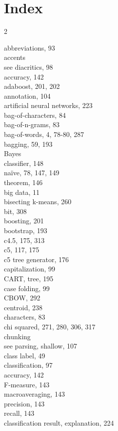 \documentclass[11pt,openany,executivepaper]{book}
\begin{document}
\chapter*{Index}
\begin{multicols}{2}\raggedright
abbreviations, 93\\
accents\\
see diacritics, 98\\
accuracy, 142\\
adaboost, 201, 202\\
annotation, 104\\
artificial neural networks, 223\\
bag-of-characters, 84\\
bag-of-n-grams, 83\\
bag-of-words, 4, 78-80, 287\\
bagging, 59, 193\\
Bayes\\
classifier, 148\\
naïve, 78, 147, 149\\
theorem, 146\\
big data, 11\\
bisecting k-means, 260\\
bit, 308\\
boosting, 201\\
bootstrap, 193\\
c4.5, 175, 313\\
c5, 117, 175\\
c5 tree generator, 176\\
capitalization, 99\\
CART, tree, 195\\
case folding, 99\\
CBOW, 292\\
centroid, 238\\
characters, 83\\
chi squared, 271, 280, 306, 317\\
chunking\\
see parsing, shallow, 107\\
class label, 49\\
classification, 97\\
accuracy, 142\\
F-measure, 143\\
macroaveraging, 143\\
precision, 143\\
recall, 143\\
classification result, explanation, 224\\

\end{multicols}
\end{document}
